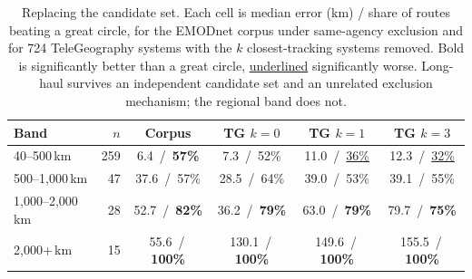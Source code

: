 \begin{table}[t]
\caption{Replacing the candidate set. Each cell is median error (km) / share of
routes beating a great circle, for the EMODnet corpus under same-agency
exclusion and for 724 TeleGeography systems with the $k$
closest-tracking systems removed. Bold is significantly better than a great
circle, \underline{underlined} significantly worse. Long-haul survives an
independent candidate set and an unrelated exclusion mechanism; the regional
band does not.}
\label{tab:candidates}
\centering\footnotesize
\begin{tabular}{@{}lrcccc@{}}
\toprule
Band & $n$ & Corpus & TG $k{=}0$ & TG $k{=}1$ & TG $k{=}3$ \\
\midrule
40--500\,km & 259 & 6.4 \,/\, \textbf{57\%} & 7.3 \,/\, 52\% & 11.0 \,/\, \underline{36\%} & 12.3 \,/\, \underline{32\%} \\
500--1,000\,km & 47 & 37.6 \,/\, 57\% & 28.5 \,/\, 64\% & 39.0 \,/\, 53\% & 39.1 \,/\, 55\% \\
1,000--2,000\,km & 28 & 52.7 \,/\, \textbf{82\%} & 36.2 \,/\, \textbf{79\%} & 63.0 \,/\, \textbf{79\%} & 79.7 \,/\, \textbf{75\%} \\
2,000+\,km & 15 & 55.6 \,/\, \textbf{100\%} & 130.1 \,/\, \textbf{100\%} & 149.6 \,/\, \textbf{100\%} & 155.5 \,/\, \textbf{100\%} \\
\bottomrule
\end{tabular}
\end{table}
